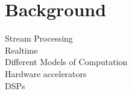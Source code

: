 \chapter{Background}
\label{chapter:background}
Stream Processing \\
Realtime \\
Different Models of Computation \\
Hardware accelerators \\
DSPs \\

